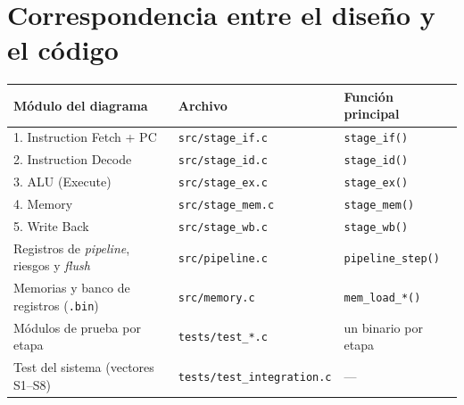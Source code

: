 \documentclass[11pt,a4paper]{article}
\begin{document}
\clearpage
\section{Correspondencia entre el diseño y el código}

\begin{table}[H]
\centering\small
\begin{tabular}{@{}lll@{}}
\toprule
Módulo del diagrama & Archivo & Función principal \\
\midrule
1. Instruction Fetch + PC & \texttt{src/stage\_if.c}  & \texttt{stage\_if()} \\
2. Instruction Decode     & \texttt{src/stage\_id.c}  & \texttt{stage\_id()} \\
3. ALU (Execute)          & \texttt{src/stage\_ex.c}  & \texttt{stage\_ex()} \\
4. Memory                 & \texttt{src/stage\_mem.c} & \texttt{stage\_mem()} \\
5. Write Back             & \texttt{src/stage\_wb.c}  & \texttt{stage\_wb()} \\
\midrule
Registros de \emph{pipeline}, riesgos y \emph{flush} & \texttt{src/pipeline.c} & \texttt{pipeline\_step()} \\
Memorias y banco de registros (\texttt{.bin})        & \texttt{src/memory.c}   & \texttt{mem\_load\_*()} \\
Módulos de prueba por etapa                          & \texttt{tests/test\_*.c} & un binario por etapa \\
Test del sistema (vectores S1--S8)                   & \texttt{tests/test\_integration.c} & --- \\
\bottomrule
\end{tabular}
\end{table}
\end{document}
